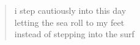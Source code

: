 \begin{verse}
i step cautiously into this day \\
letting the sea roll to my feet \\
instead of stepping into the surf
\end{verse}
